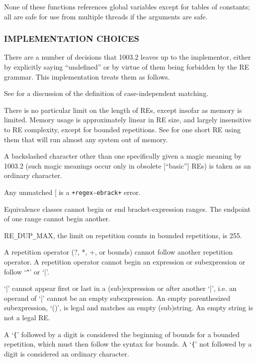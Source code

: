 
None of these functions references global variables except for tables
of constants; all are safe for use from multiple threads if the
arguments are safe.

\subsubsection{IMPLEMENTATION CHOICES}

There are a number of decisions that 1003.2 leaves up to the
implementor, either by explicitly saying ``undefined'' or by virtue of
them being forbidden by the RE grammar. This implementation treats
them as follows.

See  for a discussion of the definition of
case-independent matching.

There is no particular limit on the length of REs, except insofar as
memory is limited. Memory usage is approximately linear in RE size,
and largely insensitive to RE complexity, except for bounded
repetitions. See  for one short RE using them
that will run almost any system out of memory.

A backslashed character other than one specifically given a magic
meaning by 1003.2 (such magic meanings occur only in obsolete
[``basic''] REs) is taken as an ordinary character.

Any unmatched [ is a \texttt{+regex-ebrack+} error.

Equivalence classes cannot begin or end bracket-expression ranges. The
endpoint of one range cannot begin another.

RE\verb|_|DUP\verb|_|MAX, the limit on repetition counts in bounded
repetitions, is 255.

A repetition operator (?, *, +, or bounds) cannot follow another
repetition operator. A repetition operator cannot begin an expression
or subexpression or follow `\verb|^|' or `|'.

`|' cannot appear first or last in a (sub)expression or after another
`|', i.e. an operand of `|' cannot be an empty subexpression. An empty
parenthesized subexpression, `()', is legal and matches an empty
(sub)string. An empty string is not a legal RE.

A `\verb|{|' followed by a digit is considered the beginning of bounds
for a bounded repetition, which must then follow the syntax for
bounds. A `\verb|{|' not followed by a digit is considered an
ordinary character.

